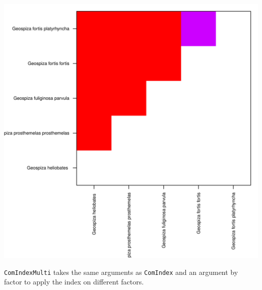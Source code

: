 \documentclass[12pt]{article}\usepackage[]{graphicx}\usepackage[]{color}
\makeatletter
\def\maxwidth{ %
  \ifdim\Gin@nat@width>\linewidth
    \linewidth
  \else
    \Gin@nat@width
  \fi
}
\newenvironment{knitrout}{}{} %
\makeatother
\begin{document}
\begin{knitrout}
\includegraphics[width=\maxwidth]{figure/unnamed-chunk-562} 

\end{knitrout}

\texttt{ComIndexMulti} takes the same arguments as \texttt{ComIndex} and an argument by factor to apply the index on different factors.
\end{document}
